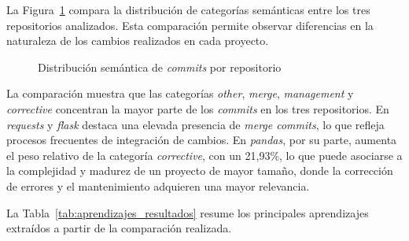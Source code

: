 \documentclass[a4paper, 12pt]{book}
\begin{document}
La Figura~\ref{fig:categorias_comparativa} compara la distribución de categorías semánticas entre los tres repositorios analizados. Esta comparación permite observar diferencias en la naturaleza de los cambios realizados en cada proyecto.

\begin{figure}[H]
\centering
{}
\caption{Distribución semántica de \emph{commits} por repositorio}
\label{fig:categorias_comparativa}
\end{figure}

La comparación muestra que las categorías \emph{other}, \emph{merge}, \emph{management} y \emph{corrective} concentran la mayor parte de los \emph{commits} en los tres repositorios. En \emph{requests} y \emph{flask} destaca una elevada presencia de \emph{merge commits}, lo que refleja procesos frecuentes de integración de cambios. En \emph{pandas}, por su parte, aumenta el peso relativo de la categoría \emph{corrective}, con un 21,93\%, lo que puede asociarse a la complejidad y madurez de un proyecto de mayor tamaño, donde la corrección de errores y el mantenimiento adquieren una mayor relevancia.

La Tabla~\ref{tab:aprendizajes_resultados} resume los principales aprendizajes extraídos a partir de la comparación realizada.
\end{document}
